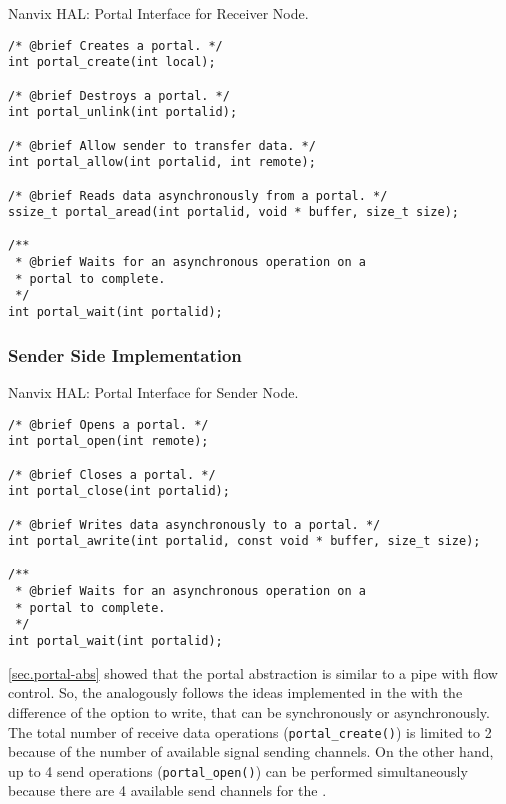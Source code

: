 \begin{listing}[!tb]
\caption{Nanvix HAL: Portal Interface for Receiver Node.}
\label{code:hal-portal-receiver}
\begin{verbatim}
/* @brief Creates a portal. */
int portal_create(int local);

/* @brief Destroys a portal. */
int portal_unlink(int portalid);

/* @brief Allow sender to transfer data. */
int portal_allow(int portalid, int remote);

/* @brief Reads data asynchronously from a portal. */
ssize_t portal_aread(int portalid, void * buffer, size_t size);

/**
 * @brief Waits for an asynchronous operation on a
 * portal to complete.
 */
int portal_wait(int portalid);
\end{verbatim}
\end{listing}

			\subsubsection{Sender Side Implementation}

\begin{listing}[!tb]
\caption{Nanvix HAL: Portal Interface for Sender Node.}
\label{code:hal-portal-sender}
\begin{verbatim}
/* @brief Opens a portal. */
int portal_open(int remote);

/* @brief Closes a portal. */
int portal_close(int portalid);

/* @brief Writes data asynchronously to a portal. */
int portal_awrite(int portalid, const void * buffer, size_t size);

/**
 * @brief Waits for an asynchronous operation on a
 * portal to complete.
 */
int portal_wait(int portalid);
\end{verbatim}
\end{listing}

				\autoref{sec.portal-abs} showed that the portal abstraction is similar to
				a \posix pipe with flow control.
				So, the \portal analogously follows the ideas implemented
				in the \mailbox with the difference of the option to write,
				that can be synchronously or asynchronously.
				The total number of receive data operations (\texttt{portal\_create()})
				is limited to 2 because of the number of available signal sending channels.
				On the other hand, up to 4 send operations (\texttt{portal\_open()})
				can be performed simultaneously because there are 4 available send
				channels for the \portal.

